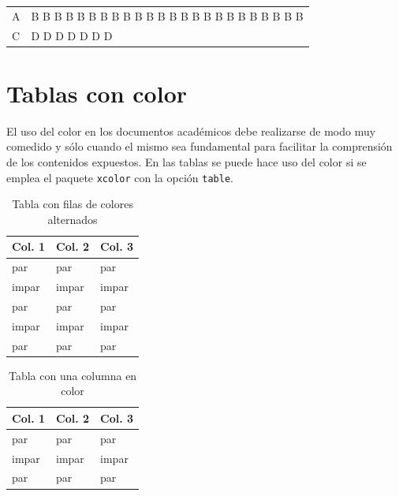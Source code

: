 \documentclass[ 		%
	11pt,				%
	a4paper,			%
	twoside,			%
	openright,			%
	final       		%
]{book}
\begin{document}
\begin{center}  
\begin{tabularx}{\textwidth}{lX}
\hline
A & B B B B B B B B B B B B B B B B B B B B B B B B\\
C & D D D D D D D\\
\hline
\end{tabularx}
\end{center}





\section{Tablas con color}
El uso del color en los documentos académicos debe realizarse de modo muy comedido y sólo cuando el mismo sea fundamental para facilitar la comprensión de los contenidos expuestos. En las tablas se puede hace uso del color si se emplea el paquete \texttt{xcolor} con la opción \texttt{table}.

\begin{table}[H]
	\centering
	\caption{Tabla con filas de colores alternados}
	\begin{tabular}{lll}
    \toprule
		Col. 1  & Col. 2  & \cellcolor{red!40}Col. 3 \\
    \midrule
		par    & par    & par   \\
		impar  & impar  & impar \\
		par    & par    & par   \\
		impar  & impar  & impar \\
		par    & par    & par   \\
    \bottomrule
	\end{tabular}
\end{table}

\begin{table}[H]
	\centering
	\caption{Tabla con una columna en color}
	\begin{tabular}{ll>{\columncolor{green!20}}l}
    \toprule
		Col. 1  & Col. 2  & Col. 3 \\
    \midrule
		par    & par    & par   \\
		impar  & impar  & impar \\
		par    & par    & par   \\
    \bottomrule
	\end{tabular}
\end{table}
\end{document}
